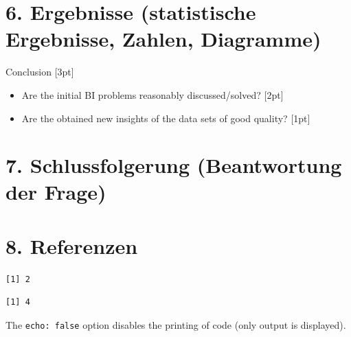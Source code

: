 \documentclass[
  journal,
]{IEEEtran}%
\begin{document}
\hypertarget{ergebnisse-statistische-ergebnisse-zahlen-diagramme}{%
\section{6. Ergebnisse (statistische Ergebnisse, Zahlen,
Diagramme)}\label{ergebnisse-statistische-ergebnisse-zahlen-diagramme}}

Conclusion {[}3pt{]}

\begin{itemize}
\item
  Are the initial BI problems reasonably discussed/solved? {[}2pt{]}
\item
  Are the obtained new insights of the data sets of good quality?
  {[}1pt{]}
\end{itemize}

\hypertarget{schlussfolgerung-beantwortung-der-frage}{%
\section{7. Schlussfolgerung (Beantwortung der
Frage)}\label{schlussfolgerung-beantwortung-der-frage}}

\hypertarget{referenzen}{%
\section{8. Referenzen}\label{referenzen}}

\begin{verbatim}
[1] 2
\end{verbatim}

\begin{verbatim}
[1] 4
\end{verbatim}

The \texttt{echo:\ false} option disables the printing of code (only
output is displayed).


\ifCLASSOPTIONcaptionsoff
  \newpage
\fi



\pagebreak[3]
\end{document}
